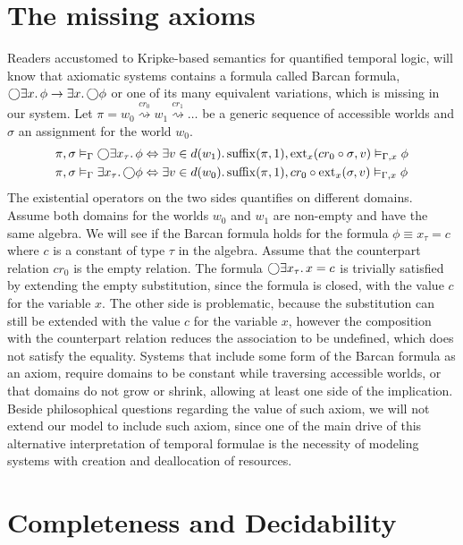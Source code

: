 \section{The missing axioms}
Readers accustomed to Kripke-based semantics for quantified temporal logic, will know that axiomatic systems contains
a formula called Barcan formula, $\bigcirc{\exists {x} \ldotp {\phi}} \to \exists {x} \ldotp {\bigcirc{\phi}}$ or one of its many
equivalent variations, which is missing in our system.
Let $\pi = w_0 \overset{cr_0}{\rightsquigarrow} w_1 \overset{cr_1}{\rightsquigarrow} \ldots$ be a generic sequence of
accessible worlds and $\sigma$ an assignment for the world $w_0$.
\begin{align*}
  {\pi}, {\sigma} \vDash_{\Gamma} {\bigcirc{\exists {x_\tau} \ldotp {\phi}}}
    &\Leftrightarrow \exists {v \in d(w_1)} \ldotp {{\operatorname{suffix}(\pi, 1)}, {\operatorname{ext}_{x}({cr_0 \circ \sigma},{v})} \vDash_{\Gamma,x} {\phi}} \\
  {\pi}, {\sigma} \vDash_{\Gamma} {\exists {x_\tau} \ldotp {\bigcirc{\phi}}}
    &\Leftrightarrow \exists {v \in d(w_0)} \ldotp {{\operatorname{suffix}(\pi, 1)}, {cr_0 \circ \operatorname{ext}_{x}({\sigma},{v})} \vDash_{\Gamma,x} {\phi}}
\end{align*}
The existential operators on the two sides quantifies on different domains. 
Assume both domains for the worlds $w_0$ and $w_1$ are non-empty and have the same algebra. We will see if
the Barcan formula holds for the formula $\phi \equiv x_\tau = c$ where $c$ is a constant of type $\tau$ in the algebra.
Assume that the counterpart relation $cr_0$ is the empty relation. The formula $\bigcirc{\exists {x_\tau} \ldotp {x = c}}$ is
trivially satisfied by extending the empty substitution, since the formula is
closed, with the value $c$ for the variable $x$. The other side is problematic, because the substitution can
still be extended with the value $c$ for the variable $x$, however the composition with the counterpart relation reduces
the association to be undefined, which does not satisfy the equality. Systems that include some form of the Barcan
formula as an axiom, require domains to be constant while traversing accessible worlds, or that domains do not grow or
shrink, allowing at least one side of the implication. Beside philosophical questions regarding the value of such axiom,
we will not extend our model to include such axiom, since one of the main drive of this alternative interpretation of
temporal formulae is the necessity of modeling systems with creation and deallocation of resources.

\section{Completeness and Decidability}

